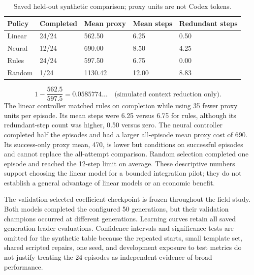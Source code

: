 \documentclass[11pt]{article}
\begin{document}
\begin{table}[htbp]
\centering
\small
\caption{Saved held-out synthetic comparison; proxy units are not Codex tokens.}
\begin{tabularx}{\linewidth}{@{}XXXXX@{}}
\toprule
Policy & Completed & Mean proxy & Mean steps & Redundant steps\\
\midrule
Linear & 24/24 & 562.50 & 6.25 & 0.50\\
Neural & 12/24 & 690.00 & 8.50 & 4.25\\
Rules & 24/24 & 597.50 & 6.75 & 0.00\\
Random & 1/24 & 1130.42 & 12.00 & 8.83\\
\bottomrule
\end{tabularx}
\end{table}
\[
1-\frac{562.5}{597.5}=0.0585774\ldots\quad\text{(simulated context reduction only).}
\]
The linear controller matched rules on completion while using 35 fewer proxy units per episode. Its mean steps were 6.25 versus 6.75 for rules, although its redundant-step count was higher, 0.50 versus zero. The neural controller completed half the episodes and had a larger all-episode mean proxy cost of 690. Its success-only proxy mean, 470, is lower but conditions on successful episodes and cannot replace the all-attempt comparison. Random selection completed one episode and reached the 12-step limit on average. These descriptive numbers support choosing the linear model for a bounded integration pilot; they do not establish a general advantage of linear models or an economic benefit.

The validation-selected coefficient checkpoint is frozen throughout the field study. Both models completed the configured 50 generations, but their validation champions occurred at different generations. Learning curves retain all saved generation-leader evaluations. Confidence intervals and significance tests are omitted for the synthetic table because the repeated starts, small template set, shared scripted repairs, one seed, and development exposure to test metrics do not justify treating the 24 episodes as independent evidence of broad performance.
\end{document}
